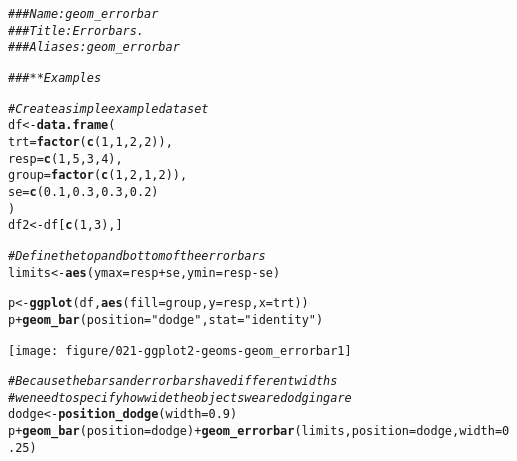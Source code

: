 \documentclass[a4paper,titlepage]{tufte-handout}\usepackage[]{graphicx}\usepackage[]{color}
\makeatletter
\def\maxwidth{ %
  \ifdim\Gin@nat@width>\linewidth
    \linewidth
  \else
    \Gin@nat@width
  \fi
}
\newcommand{\hlnum}[1]{\textcolor[rgb]{0.686,0.059,0.569}{#1}}%
\newcommand{\hlstr}[1]{\textcolor[rgb]{0.192,0.494,0.8}{#1}}%
\newcommand{\hlcom}[1]{\textcolor[rgb]{0.678,0.584,0.686}{\textit{#1}}}%
\newcommand{\hlopt}[1]{\textcolor[rgb]{0,0,0}{#1}}%
\newcommand{\hlstd}[1]{\textcolor[rgb]{0.345,0.345,0.345}{#1}}%
\newcommand{\hlkwb}[1]{\textcolor[rgb]{0.69,0.353,0.396}{#1}}%
\newcommand{\hlkwc}[1]{\textcolor[rgb]{0.333,0.667,0.333}{#1}}%
\newcommand{\hlkwd}[1]{\textcolor[rgb]{0.737,0.353,0.396}{\textbf{#1}}}%
\newenvironment{kframe}{%
 \def\at@end@of@kframe{}%
 \ifinner\ifhmode%
  \def\at@end@of@kframe{\end{minipage}}%
  \begin{minipage}{\columnwidth}%
 \fi\fi%
 \def\FrameCommand##1{\hskip\@totalleftmargin \hskip-\fboxsep
 \colorbox{shadecolor}{##1}\hskip-\fboxsep
     \hskip-\linewidth \hskip-\@totalleftmargin \hskip\columnwidth}%
 \MakeFramed {\advance\hsize-\width
   \@totalleftmargin\z@ \linewidth\hsize
   \@setminipage}}%
 {\par\unskip\endMakeFramed%
 \at@end@of@kframe}
\newenvironment{knitrout}{}{} %
\makeatother
\begin{document}
\begin{knitrout}
\color{fgcolor}\begin{kframe}
\begin{alltt}
\hlcom{### Name: geom_errorbar}
\hlcom{### Title: Error bars.}
\hlcom{### Aliases: geom_errorbar}

\hlcom{### ** Examples}

\hlcom{# Create a simple example dataset}
\hlstd{df} \hlkwb{<-} \hlkwd{data.frame}\hlstd{(}
  \hlkwc{trt} \hlstd{=} \hlkwd{factor}\hlstd{(}\hlkwd{c}\hlstd{(}\hlnum{1}\hlstd{,} \hlnum{1}\hlstd{,} \hlnum{2}\hlstd{,} \hlnum{2}\hlstd{)),}
  \hlkwc{resp} \hlstd{=} \hlkwd{c}\hlstd{(}\hlnum{1}\hlstd{,} \hlnum{5}\hlstd{,} \hlnum{3}\hlstd{,} \hlnum{4}\hlstd{),}
  \hlkwc{group} \hlstd{=} \hlkwd{factor}\hlstd{(}\hlkwd{c}\hlstd{(}\hlnum{1}\hlstd{,} \hlnum{2}\hlstd{,} \hlnum{1}\hlstd{,} \hlnum{2}\hlstd{)),}
  \hlkwc{se} \hlstd{=} \hlkwd{c}\hlstd{(}\hlnum{0.1}\hlstd{,} \hlnum{0.3}\hlstd{,} \hlnum{0.3}\hlstd{,} \hlnum{0.2}\hlstd{)}
\hlstd{)}
\hlstd{df2} \hlkwb{<-} \hlstd{df[}\hlkwd{c}\hlstd{(}\hlnum{1}\hlstd{,}\hlnum{3}\hlstd{),]}

\hlcom{# Define the top and bottom of the errorbars}
\hlstd{limits} \hlkwb{<-} \hlkwd{aes}\hlstd{(}\hlkwc{ymax} \hlstd{= resp} \hlopt{+} \hlstd{se,} \hlkwc{ymin}\hlstd{=resp} \hlopt{-} \hlstd{se)}

\hlstd{p} \hlkwb{<-} \hlkwd{ggplot}\hlstd{(df,} \hlkwd{aes}\hlstd{(}\hlkwc{fill}\hlstd{=group,} \hlkwc{y}\hlstd{=resp,} \hlkwc{x}\hlstd{=trt))}
\hlstd{p} \hlopt{+} \hlkwd{geom_bar}\hlstd{(}\hlkwc{position}\hlstd{=}\hlstr{"dodge"}\hlstd{,} \hlkwc{stat}\hlstd{=}\hlstr{"identity"}\hlstd{)}
\end{alltt}
\end{kframe}
\texttt{[image: figure/021-ggplot2-geoms-geom\_errorbar1]} 
\begin{kframe}\begin{alltt}
\hlcom{# Because the bars and errorbars have different widths}
\hlcom{# we need to specify how wide the objects we are dodging are}
\hlstd{dodge} \hlkwb{<-} \hlkwd{position_dodge}\hlstd{(}\hlkwc{width}\hlstd{=}\hlnum{0.9}\hlstd{)}
\hlstd{p} \hlopt{+} \hlkwd{geom_bar}\hlstd{(}\hlkwc{position}\hlstd{=dodge)} \hlopt{+} \hlkwd{geom_errorbar}\hlstd{(limits,} \hlkwc{position}\hlstd{=dodge,} \hlkwc{width}\hlstd{=}\hlnum{0.25}\hlstd{)}
\end{alltt}



\end{kframe}
\end{knitrout}
\end{document}
